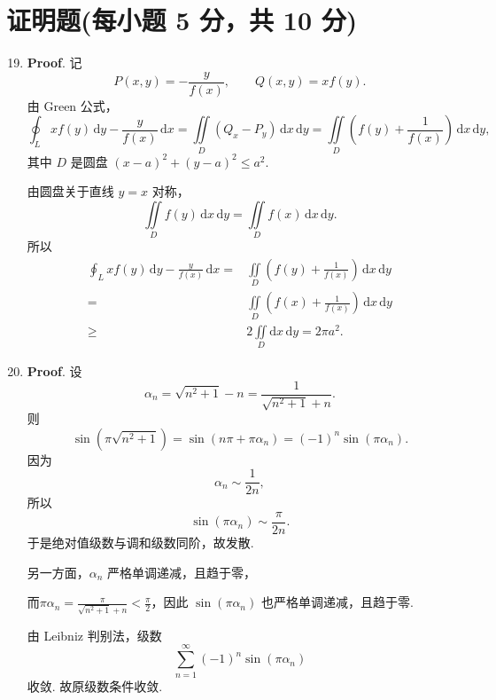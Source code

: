 \documentclass[../main.tex]{subfiles}
\begin{document}
\section{证明题(每小题 5 分，共 10 分)}
\begin{enumerate}
  \setcounter{enumi}{18}
  \item \textbf{Proof}. 记
        \[
          P(x,y)=-\frac{y}{f(x)},\qquad Q(x,y)=xf(y).
        \]
        由 Green 公式，
        \[
          \oint_L xf(y)\,\mathrm{d}y-\frac{y}{f(x)}\,\mathrm{d}x
          =\iint\limits_D\left(Q_x-P_y\right)\,\mathrm{d}x\,\mathrm{d}y
          =\iint\limits_D\left(f(y)+\frac1{f(x)}\right)\,\mathrm{d}x\,\mathrm{d}y,
        \]
        其中 \(D\) 是圆盘 \((x-a)^2+(y-a)^2\le a^2\).

        由圆盘关于直线 \(y=x\) 对称，
        \[
          \iint\limits_D f(y)\,\mathrm{d}x\,\mathrm{d}y=\iint\limits_D f(x)\,\mathrm{d}x\,\mathrm{d}y.
        \]
        所以
        \[
          \begin{aligned}
            \oint_L xf(y)\,\mathrm{d}y-\frac{y}{f(x)}\,\mathrm{d}x
                                                                   = {} & \iint\limits_D\left(f(y)+\frac1{f(x)}\right)\,\mathrm{d}x\,\mathrm{d}y \\
            = {}                                                   & \iint\limits_D\left(f(x)+\frac1{f(x)}\right)\,\mathrm{d}x\,\mathrm{d}y      \\
            \ge {}                                                 & 2\iint\limits_D \mathrm{d}x\,\mathrm{d}y=2\pi a^2.
          \end{aligned}
        \]

  \item \textbf{Proof}. 设
        \[
          \alpha_n=\sqrt{n^2+1}-n=\frac{1}{\sqrt{n^2+1}+n}.
        \]
        则
        \[
          \sin\left(\pi\sqrt{n^2+1}\right)
          =\sin(n\pi+\pi\alpha_n)=(-1)^n\sin(\pi\alpha_n).
        \]
        因为
        \[
          \alpha_n\sim\frac{1}{2n},
        \]
        所以
        \[
          \sin(\pi\alpha_n)\sim \frac{\pi}{2n}.
        \]
        于是绝对值级数与调和级数同阶，故发散.

        另一方面，\(\alpha_n\) 严格单调递减，且趋于零，

        而$\pi\alpha_n = \frac{\pi}{\sqrt{n^2+1}+n}<\frac{\pi}{2}$，因此 \(\sin(\pi\alpha_n)\) 也严格单调递减，且趋于零.

        由 Leibniz 判别法，级数
        \[
          \sum_{n=1}^{\infty}(-1)^n\sin(\pi\alpha_n)
        \]
        收敛. 故原级数条件收敛.

\end{enumerate}
\end{document}
